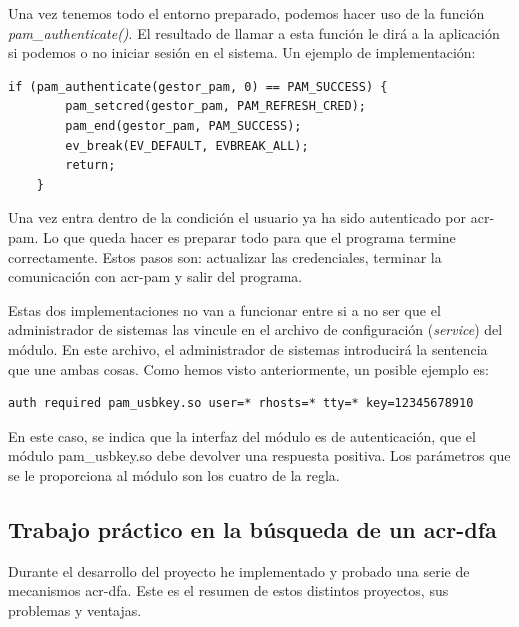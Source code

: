\documentclass[titlepage, 12pt, a4paper]{article}
\begin{document}
{Una vez tenemos todo el entorno preparado, podemos hacer uso de la función \textit{pam\_authenticate()}. El resultado de llamar a esta función le dirá a la aplicación si podemos o no iniciar sesión en el sistema. Un ejemplo de implementación:
\begin{lstlisting}[xleftmargin=.07\textwidth]
    if (pam_authenticate(gestor_pam, 0) == PAM_SUCCESS) {
        pam_setcred(gestor_pam, PAM_REFRESH_CRED);
        pam_end(gestor_pam, PAM_SUCCESS);
        ev_break(EV_DEFAULT, EVBREAK_ALL);
        return;
    }
\end{lstlisting}
Una vez entra dentro de la condición el usuario ya ha sido autenticado por \gls{acr-pam}. Lo que queda hacer es preparar todo para que el programa termine correctamente. Estos pasos son: actualizar las credenciales, terminar la comunicación con \gls{acr-pam} y salir del programa.\par
Estas dos implementaciones no van a funcionar entre si a no ser que el administrador de sistemas las vincule en el archivo de configuración (\textit{service}) del módulo. En este archivo, el administrador de sistemas introducirá la sentencia que une ambas cosas. Como hemos visto anteriormente, un posible ejemplo es:
\begin{lstlisting}
auth required pam_usbkey.so user=* rhosts=* tty=* key=12345678910
\end{lstlisting}
En este caso, se indica que la interfaz del módulo es de autenticación, que el módulo pam\_usbkey.so debe devolver una respuesta positiva. Los parámetros que se le proporciona al módulo son los cuatro de la regla.
\subsection{Trabajo práctico en la búsqueda de un \gls{acr-dfa}}
Durante el desarrollo del proyecto he implementado y probado una serie de mecanismos \gls{acr-dfa}. Este es el resumen de estos distintos proyectos, sus problemas y ventajas.
}
\end{document}
